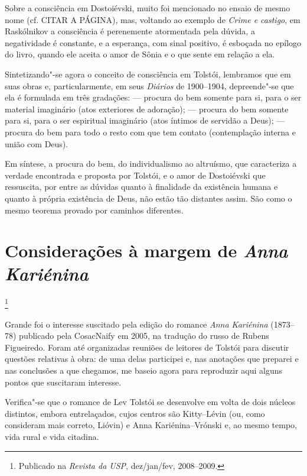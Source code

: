 Sobre a consciência em Dostoiévski, muito foi mencionado no
ensaio de mesmo nome (cf. CITAR A PÁGINA), mas, voltando ao
exemplo de \emph{Crime e castigo}, em Raskólnikov a consciência
é perenemente atormentada pela dúvida, a negatividade é constante,
e a esperança, com sinal positivo, é esboçada no epílogo do livro,
quando ele aceita o amor de Sônia e o que sente em relação a ela.

Sintetizando"-se agora o conceito de consciência em Tolstói, lembramos que em suas obras e, particularmente, em seus \emph{Diários} de 1900--1904, depreende"-se que ela é formulada em três gradações:  --- procura do bem somente para si, para o ser material imaginário (atos exteriores de adoração);  --- procura do bem somente para si, para o ser espiritual imaginário (atos íntimos de servidão a Deus);  --- procura do bem para todo o resto com que tem contato (contemplação interna e união com Deus).

Em síntese, a procura do bem, do individualismo ao altruísmo, que caracteriza a verdade encontrada e proposta por Tolstói, e o amor de Dostoiévski que ressuscita, por entre as dúvidas quanto à finalidade da existência humana e quanto à própria existência de Deus, não estão tão distantes assim. São como o mesmo teorema provado por caminhos diferentes.

\chapter{Considerações à margem de \emph{Anna Kariénina}}\footnote{Publicado na \emph{Revista da USP}, dez/jan/fev, 2008--2009.}

Grande foi o interesse suscitado pela edição do romance \emph{Anna
Kariénina} (1873--78) publicado pela CosacNaify em 2005, na tradução do russo de Rubens Figueiredo. Foram até organizadas
reuniões de leitores de Tolstói para discutir questões relativas à
obra: de uma delas participei e, nas anotações que preparei e nas
conclusões a que chegamos, me baseio agora para reproduzir aqui alguns
pontos que suscitaram interesse.

Verifica"-se que o romance de Lev Tolstói se desenvolve em
volta de dois núcleos distintos, embora entrelaçados, cujos centros
são Kitty--Lévin (ou, como consideram mais correto, Lióvin) e Anna Kariénina--Vrónski e, ao mesmo tempo, vida
rural e vida citadina.


